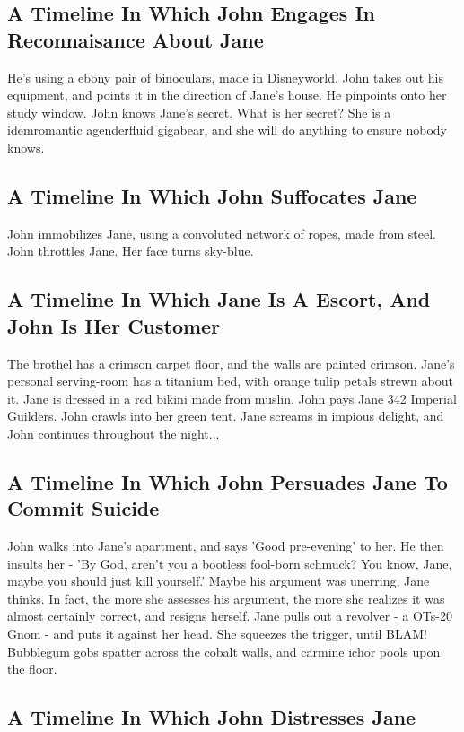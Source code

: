 \documentclass{article}
\begin{document}
\subsection{A Timeline In Which John Engages In Reconnaisance About Jane}


He's using a ebony pair of binoculars, made in Disneyworld.
John takes out his equipment, and points it in the direction of Jane's house. He pinpoints onto her study window.
John knows Jane's secret. What is her secret? She is a idemromantic agenderfluid gigabear, and she will do anything to ensure nobody knows.
\subsection{A Timeline In Which John Suffocates Jane}


John immobilizes Jane, using a convoluted network of ropes, made from steel.
John throttles Jane.
Her face turns sky{-}blue.
\subsection{A Timeline In Which Jane Is A Escort, And John Is Her Customer}


The brothel has a crimson carpet floor, and the walls are painted crimson.
Jane's personal serving{-}room has a titanium bed, with orange tulip petals strewn about it.
Jane is dressed in a red bikini made from muslin.
John pays Jane 342 Imperial Guilders.
John crawls into her green tent.
Jane screams in impious delight, and John continues throughout the night...
\subsection{A Timeline In Which John Persuades Jane To Commit Suicide}


John walks into Jane's apartment, and says 'Good pre{-}evening' to her.
He then insults her {-} 'By God, aren't you a bootless fool{-}born schmuck?
You know, Jane, maybe you should just kill yourself.'
Maybe his argument was unerring, Jane thinks.
In fact, the more she assesses his argument, the more she realizes it was almost certainly correct, and resigns herself.
Jane pulls out a revolver {-} a OTs{-}20 Gnom {-} and puts it against her head.
She squeezes the trigger, until BLAM!
Bubblegum gobs spatter across the cobalt walls, and carmine ichor pools upon the floor.
\subsection{A Timeline In Which John Distresses Jane}
\end{document}
